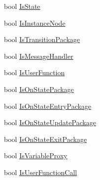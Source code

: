 \begin{DoxyCompactItemize}
\item 
bool \hyperlink{classi_c_s___editor_object_a782f1536bab33ded1afc47826331b830}{Is\+State}
\item 
bool \hyperlink{classi_c_s___editor_object_a166f1688cda25ee1885a91107b847bf8}{Is\+Instance\+Node}
\item 
bool \hyperlink{classi_c_s___editor_object_ad80838fc0308dc8fdc6887f04726fccf}{Is\+Transition\+Package}
\item 
bool \hyperlink{classi_c_s___editor_object_af160fe955f4f37cf64923de50d1947fa}{Is\+Message\+Handler}
\item 
bool \hyperlink{classi_c_s___editor_object_ae06bdbeec62fddd77e22d30cfa79c972}{Is\+User\+Function}
\item 
bool \hyperlink{classi_c_s___editor_object_a99e26b5314a282bd1339a0aa4d45e5c5}{Is\+On\+State\+Package}
\item 
bool \hyperlink{classi_c_s___editor_object_a959890c006be6728ce72b2497d42a0aa}{Is\+On\+State\+Entry\+Package}
\item 
bool \hyperlink{classi_c_s___editor_object_ad91e143357b19ef303e4ade32fc6e1fd}{Is\+On\+State\+Update\+Package}
\item 
bool \hyperlink{classi_c_s___editor_object_af718a59ec401ff2e57026db7005916ec}{Is\+On\+State\+Exit\+Package}
\item 
bool \hyperlink{classi_c_s___editor_object_a76878cc84469e439d67b868d15dc66ca}{Is\+Variable\+Proxy}
\item 
bool \hyperlink{classi_c_s___editor_object_a04070d1b905b9d866de45e72d9460951}{Is\+User\+Function\+Call}
\item 

\end{DoxyCompactItemize}
